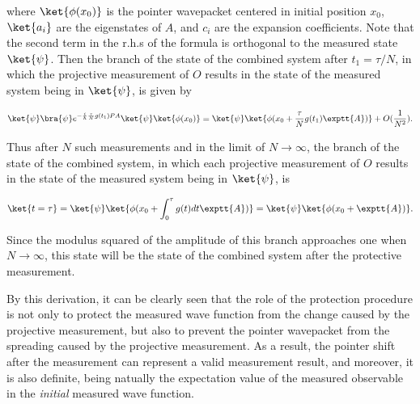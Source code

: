 \noindent where $\ket{\phi(x_0)}$ is the pointer wavepacket centered in initial position $x_0$, $\ket{a_i}$ are the eigenstates of $A$, and $c_i$ are the expansion coefficients. Note that the second term in the r.h.s of the formula is orthogonal to the measured state $\ket{\psi}$. Then the branch of the state of the combined system after $t_1=\tau/N$, in which the projective measurement of $O$ results in the state of the measured system being in $\ket{\psi}$, is given by 

\begin{eqnarray}
  \ket{\psi}\bra{\psi}e^{-{i\over\hbar}{\tau\over N}g(t_1)P A}\ket{\psi}\ket{\phi(x_0)} 
= \ket{\psi}\ket{\phi(x_0+ {\tau\over N}g(t_1)\exptt{A})} + O({1 \over N^2}).
\label{}
\end{eqnarray}

\noindent Thus after $N$ such measurements and in the limit of $N \rightarrow \infty$, the branch of the state of the combined system, in which each projective measurement of $O$ results in the state of the measured system being in $\ket{\psi}$, is

\begin{eqnarray}
\ket{t=\tau} = \ket{\psi}\ket{\phi(x_0+\int_{0}^{\tau}g(t)dt\exptt{A})}= \ket{\psi}\ket{\phi(x_0+\exptt{A})}.
\label{}
\end{eqnarray}

\noindent Since the modulus squared of the amplitude of this branch approaches one when $N \rightarrow \infty$, this state will be the state of the combined system after the protective measurement.


By this derivation, it can be clearly seen that the role of the protection procedure is not only to protect the measured wave function from the change caused by the projective measurement, but also to prevent the pointer wavepacket from the spreading caused by the projective measurement. 
As a result, the pointer shift after the measurement can represent a valid measurement result, and moreover, it is also definite, being natually the expectation value of the measured observable in the \emph{initial} measured wave function.  

